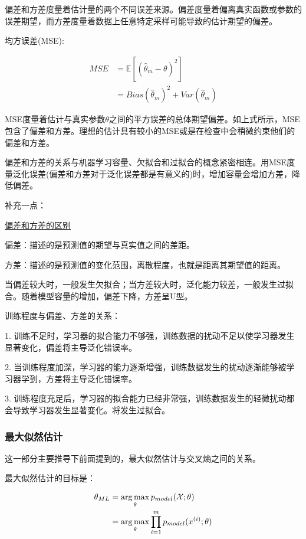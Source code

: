 偏差和方差度量着估计量的两个不同误差来源。偏差度量着偏离真实函数或参数的误差期望，而方差度量着数据上任意特定采样可能导致的估计期望的偏差。

均方误差(MSE):

\begin{align*}
MSE & = \mathbb{E} \left[ (\hat{\theta}_m - \theta)^2 \right] \\
   & = Bias(\hat{\theta}_m)^2 + Var(\hat{\theta}_m)
\end{align*}

MSE度量着估计与真实参数$\theta$之间的平方误差的总体期望偏差。如上式所示，MSE包含了偏差和方差。理想的估计具有较小的MSE或是在检查中会稍微约束他们的偏差和方差。

偏差和方差的关系与机器学习容量、欠拟合和过拟合的概念紧密相连。用MSE度量泛化误差(偏差和方差对于泛化误差都是有意义的)时，增加容量会增加方差，降低偏差。

补充一点：

\href{https://www.zhihu.com/question/20448464/answer/20039077}{偏差和方差的区别}

偏差：描述的是预测值的期望与真实值之间的差距。

方差：描述的是预测值的变化范围，离散程度，也就是距离其期望值的距离。

当偏差较大时，一般发生欠拟合；当方差较大时，泛化能力较差，一般发生过拟合。随着模型容量的增加，偏差下降，方差呈U型。

训练程度与偏差、方差的关系：

1. 训练不足时，学习器的拟合能力不够强，训练数据的扰动不足以使学习器发生显著变化，偏差将主导泛化错误率。

2. 当训练程度加深，学习器的能力逐渐增强，训练数据发生的扰动逐渐能够被学习器学到，方差将主导泛化错误率。

3. 训练程度充足后，学习器的拟合能力已经非常强，训练数据发生的轻微扰动都会导致学习器发生显著变化。将发生过拟合。

\subsubsection{最大似然估计}

这一部分主要推导下前面提到的，最大似然估计与交叉熵之间的关系。

最大似然估计的目标是：

\begin{align*}
\mathbf{\theta}_{ML} &= \operatorname*{arg\,max}_{\mathbf{\theta}} p_{model} (\mathcal{X}; \mathbf{\theta}) \\
					& = \operatorname*{arg\,max}_{\mathbf{\theta}} \prod_{i=1}^{m} p_{model}(x^{(i)}; \mathbf{\theta})
\end{align*}


